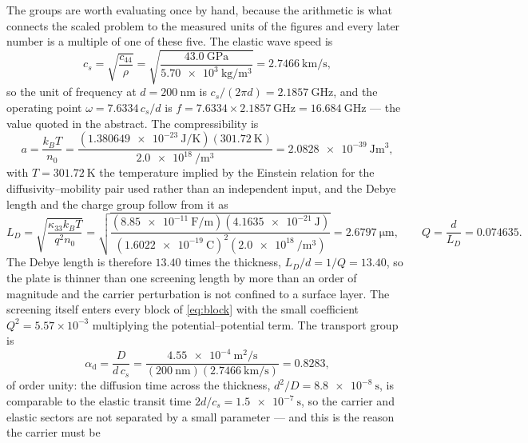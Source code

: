 The groups are worth evaluating once by hand, because the arithmetic is what
connects the scaled problem to the measured units of the figures and every later
number is a multiple of one of these five.  The elastic wave speed is
\begin{equation}
\label{eq:cs_worked}
c_s=\sqrt{\frac{c_{44}}{\rho}}
=\sqrt{\frac{\SI{43.0}{\giga\pascal}}{\SI{5.70e3}{\kilo\gram\per\cubic\metre}}}
=\SI{2.7466}{\kilo\metre\per\second},
\end{equation}
so the unit of frequency at $d=\SI{200}{\nano\metre}$ is
$c_s/(2\pi d)=\SI{2.1857}{\giga\hertz}$, and the operating point
$\omega=7.6334\,c_s/d$ is $f=7.6334\times\SI{2.1857}{\giga\hertz}=
\SI{16.684}{\giga\hertz}$ --- the value quoted in the abstract.  The
compressibility is
\begin{equation}
\label{eq:a_worked}
a=\frac{k_BT}{n_0}=\frac{(\SI{1.380649e-23}{\joule\per\kelvin})
(\SI{301.72}{\kelvin})}{\SI{2.0e18}{\per\cubic\metre}}
=\SI{2.0828e-39}{\joule\metre^{3}},
\end{equation}
with $T=\SI{301.72}{\kelvin}$ the temperature implied by the Einstein relation for
the diffusivity--mobility pair used rather than an independent input, and the
Debye length and the charge group follow from it as
\begin{equation}
\label{eq:LD_worked}
L_D=\sqrt{\frac{\kappa_{33}k_BT}{q^{2}n_0}}
=\sqrt{\frac{(\SI{8.85e-11}{\farad\per\metre})(\SI{4.1635e-21}{\joule})}
{(\SI{1.6022e-19}{\coulomb})^{2}(\SI{2.0e18}{\per\cubic\metre})}}
=\SI{2.6797}{\micro\metre},
\qquad
Q=\frac{d}{L_D}=0.074635 .
\end{equation}
The Debye length is therefore $13.40$ times the thickness, $L_D/d=1/Q=13.40$,
so the plate is thinner than one screening length by more than an order of
magnitude and the carrier perturbation is not confined to a surface layer.  The
screening itself enters every block of \eqref{eq:block} with the small
coefficient $Q^{2}=5.57\times10^{-3}$ multiplying the potential--potential
term.  The
transport group is
\begin{equation}
\label{eq:alphad_worked}
\alpha_{\mathrm d}=\frac{D}{d\,c_s}
=\frac{\SI{4.55e-4}{\square\metre\per\second}}
{(\SI{200}{\nano\metre})(\SI{2.7466}{\kilo\metre\per\second})}
=0.8283 ,
\end{equation}
of order unity: the diffusion time across the thickness,
$d^{2}/D=\SI{8.8e-8}{\second}$, is comparable to the elastic transit time
$2d/c_s=\SI{1.5e-7}{\second}$, so the carrier and elastic sectors are not
separated by a small parameter --- and this is the reason the carrier must be
